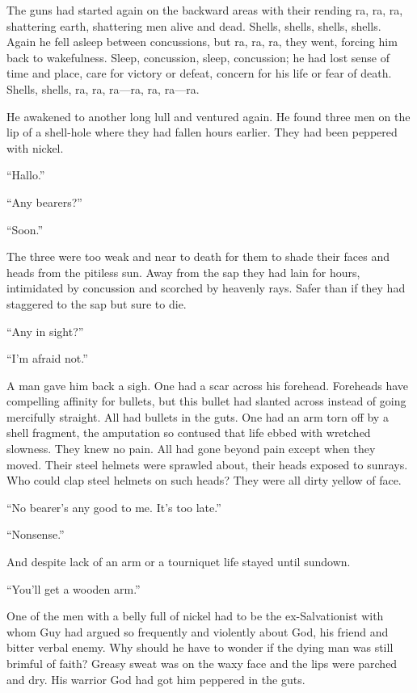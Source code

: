 The guns had started again on the backward areas with their rending ra, ra, ra, shattering earth, shattering men alive and dead. Shells, shells, shells, shells. Again he fell asleep between concussions, but ra, ra, ra, they went, forcing him back to wakefulness. Sleep, concussion, sleep, concussion; he had lost sense of time and place, care for victory or defeat, concern for his life or fear of death. Shells, shells, ra, ra, ra---ra, ra, ra---ra.

He awakened to another long lull and ventured again. He found three men on the lip of a shell-hole where they had fallen hours earlier. They had been peppered with nickel.

``Hallo.''

``Any bearers?''

``Soon.''

The three were too weak and near to death for them to shade their faces and heads from the pitiless sun. Away from the sap they had lain for hours, intimidated by concussion and scorched by heavenly rays. Safer than if they had staggered to the sap but sure to die.

``Any in sight?''

``I'm afraid not.''

A man gave him back a sigh. One had a scar across his forehead. Foreheads have compelling affinity for bullets, but this bullet had slanted across instead of going mercifully straight. All had bullets in the guts. One had an arm torn off by a shell fragment, the amputation so contused that life ebbed with wretched slowness. They knew no pain. All had gone beyond pain except when they moved. Their steel helmets were sprawled about, their heads exposed to sunrays. Who could clap steel helmets on such heads? They were all dirty yellow of face.

``No bearer's any good to me. It's too late.''

``Nonsense.''

And despite lack of an arm or a tourniquet life stayed until sundown.

``You'll get a wooden arm.''

One of the men with a belly full of nickel had to be the ex-Salvationist with whom Guy had argued so frequently and violently about God, his friend and bitter verbal enemy. Why should he have to wonder if the dying man was still brimful of faith? Greasy sweat was on the waxy face and the lips were parched and dry. His warrior God had got him peppered in the guts.

